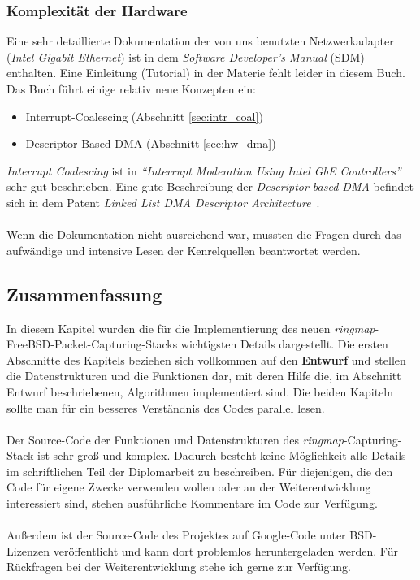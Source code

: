 \subsubsection{Komplexität der Hardware}
Eine sehr detaillierte Dokumentation der von uns benutzten Netzwerkadapter
(\emph{Intel Gigabit Ethernet}) ist in dem \emph{Software Developer’s Manual}
(SDM)~\cite{e1000_sdm} enthalten. Eine Einleitung (Tutorial) in der Materie
fehlt leider in diesem Buch. Das Buch führt einige relativ neue Konzepten ein:
\begin{itemize}
        \item Interrupt-Coalescing (Abschnitt \ref{sec:intr_coal})
        \item Descriptor-Based-DMA (Abschnitt \ref{sec:hw_dma})
\end{itemize}
\emph{Interrupt Coalescing} ist in \emph{``Interrupt Moderation Using Intel GbE
Controllers''}~\cite{intrr_mod} sehr gut beschrieben. Eine gute Beschreibung
der \emph{Descriptor-based DMA} befindet sich in dem Patent \emph{Linked List
DMA Descriptor Architecture}~\cite{dma_desc_base}.\\\\
%
Wenn die Dokumentation nicht ausreichend war, mussten die Fragen durch das
aufwändige und intensive Lesen der Kenrelquellen beantwortet werden.

\subsection{Zusammenfassung}
In diesem Kapitel wurden die für die Implementierung des neuen 
\emph{ringmap}-FreeBSD-Packet-Capturing-Stacks wichtigsten Details dargestellt. Die ersten
Abschnitte des Kapitels beziehen sich vollkommen auf den \textbf{Entwurf} und
stellen die Datenstrukturen und die Funktionen dar, mit deren Hilfe die, im
Abschnitt Entwurf beschriebenen, Algorithmen implementiert sind.  Die beiden
Kapiteln sollte man für ein besseres Verständnis des Codes parallel lesen.\\\\
%
Der Source-Code der Funktionen und Datenstrukturen des 
\emph{ringmap}-Capturing-Stack ist sehr groß und komplex. Dadurch besteht keine
Möglichkeit alle Details im schriftlichen Teil der Diplomarbeit zu beschreiben.
Für diejenigen, die den Code für eigene Zwecke verwenden wollen oder an der
Weiterentwicklung interessiert sind, stehen ausführliche Kommentare im Code zur
Verfügung. \\\\
%
Außerdem ist der Source-Code des Projektes auf Google-Code unter BSD-Lizenzen
veröffentlicht und kann dort problemlos heruntergeladen werden. Für Rückfragen
bei der Weiterentwicklung stehe ich gerne zur Verfügung.

